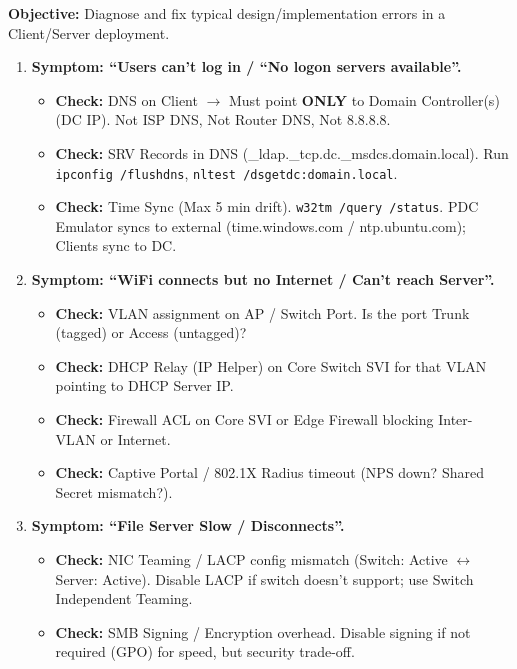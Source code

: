 \documentclass[11pt]{article}
\begin{document}
\begin{methode}
\textbf{Objective:} Diagnose and fix typical design/implementation errors in a Client/Server deployment.

\begin{enumerate}
    \item \textbf{Symptom: ``Users can't log in / ``No logon servers available''.}
    \begin{itemize}
        \item \textbf{Check:} DNS on Client $\rightarrow$ Must point \textbf{ONLY} to Domain Controller(s) (DC IP). Not ISP DNS, Not Router DNS, Not 8.8.8.8.
        \item \textbf{Check:} SRV Records in DNS (\_ldap.\_tcp.dc.\_msdcs.domain.local). Run \texttt{ipconfig /flushdns}, \texttt{nltest /dsgetdc:domain.local}.
        \item \textbf{Check:} Time Sync (Max 5 min drift). \texttt{w32tm /query /status}. PDC Emulator syncs to external (time.windows.com / ntp.ubuntu.com); Clients sync to DC.
    \end{itemize}
    \item \textbf{Symptom: ``WiFi connects but no Internet / Can't reach Server''.}
    \begin{itemize}
        \item \textbf{Check:} VLAN assignment on AP / Switch Port. Is the port Trunk (tagged) or Access (untagged)?
        \item \textbf{Check:} DHCP Relay (IP Helper) on Core Switch SVI for that VLAN pointing to DHCP Server IP.
        \item \textbf{Check:} Firewall ACL on Core SVI or Edge Firewall blocking Inter-VLAN or Internet.
        \item \textbf{Check:} Captive Portal / 802.1X Radius timeout (NPS down? Shared Secret mismatch?).
    \end{itemize}
    \item \textbf{Symptom: ``File Server Slow / Disconnects''.}
    \begin{itemize}
        \item \textbf{Check:} NIC Teaming / LACP config mismatch (Switch: Active $\leftrightarrow$ Server: Active). Disable LACP if switch doesn't support; use Switch Independent Teaming.
        \item \textbf{Check:} SMB Signing / Encryption overhead. Disable signing if not required (GPO) for speed, but security trade-off.

\end{itemize}
\end{enumerate}
\end{methode}
\end{document}
